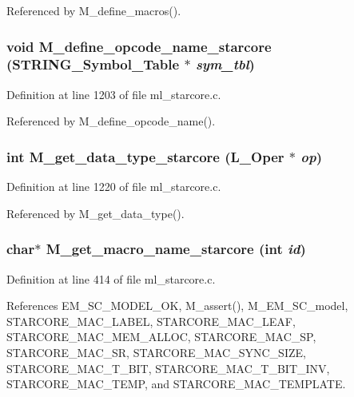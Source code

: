 Referenced by M\_\-define\_\-macros().
\subsubsection{\setlength{\rightskip}{0pt plus 5cm}void M\_\-define\_\-opcode\_\-name\_\-starcore (\bf{STRING\_\-Symbol\_\-Table} $\ast$ {\em sym\_\-tbl})}\label{ml__starcore_8c_9bb5d965e6782eb55395f7349eaebd1e}




Definition at line 1203 of file ml\_\-starcore.c.

Referenced by M\_\-define\_\-opcode\_\-name().
\subsubsection{\setlength{\rightskip}{0pt plus 5cm}int M\_\-get\_\-data\_\-type\_\-starcore (L\_\-Oper $\ast$ {\em op})}\label{ml__starcore_8c_fc2438aed4ed8dd088101be27cea86da}




Definition at line 1220 of file ml\_\-starcore.c.

Referenced by M\_\-get\_\-data\_\-type().
\subsubsection{\setlength{\rightskip}{0pt plus 5cm}char$\ast$ M\_\-get\_\-macro\_\-name\_\-starcore (int {\em id})}\label{ml__starcore_8c_3ac81eae133fb08ab8ca2d6487362bd8}




Definition at line 414 of file ml\_\-starcore.c.

References EM\_\-SC\_\-MODEL\_\-OK, M\_\-assert(), M\_\-EM\_\-SC\_\-model, STARCORE\_\-MAC\_\-LABEL, STARCORE\_\-MAC\_\-LEAF, STARCORE\_\-MAC\_\-MEM\_\-ALLOC, STARCORE\_\-MAC\_\-SP, STARCORE\_\-MAC\_\-SR, STARCORE\_\-MAC\_\-SYNC\_\-SIZE, STARCORE\_\-MAC\_\-T\_\-BIT, STARCORE\_\-MAC\_\-T\_\-BIT\_\-INV, STARCORE\_\-MAC\_\-TEMP, and STARCORE\_\-MAC\_\-TEMPLATE.

